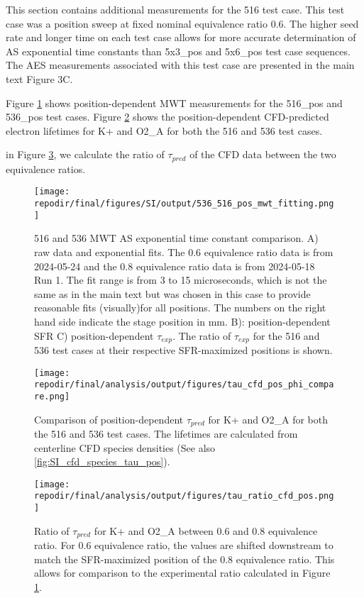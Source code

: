 This section contains additional measurements for the 516 test case. This test case was a position sweep at fixed nominal equivalence ratio 0.6. The higher seed rate and longer time on each test case allows for more accurate determination of AS exponential time constants than 5x3\_pos and 5x6\_pos test case sequences. The AES measurements associated with this test case are presented in the main text Figure 3C.

Figure \ref{fig:SI_536_516_pos_mwt_fitting} shows position-dependent MWT measurements for the 516\_pos and 536\_pos test cases. Figure \ref{fig:SI_tau_cfd_pos_phi_compare} shows the position-dependent CFD-predicted electron lifetimes for K+ and O2\_A for both the 516 and 536 test cases. 

in Figure \ref{fig:SI_tau_ratio_cfd_pos}, we calculate the ratio of $\tau_{pred}$ of the CFD data between the two equivalence ratios.


\begin{figure}[]
\centering
\texttt{[image: \\repodir/final/figures/SI/output/536\_516\_pos\_mwt\_fitting.png]}
\caption{516 and 536 MWT AS exponential time constant comparison. A) raw data and exponential fits. The 0.6 equivalence ratio data is from 2024-05-24 and the 0.8 equivalence ratio data is from 2024-05-18 Run 1. The fit range is from 3 to 15 microseconds, which is not the same as in the main text but was chosen in this case to provide reasonable fits (visually)for all positions. The numbers on the right hand side indicate the stage position in mm. B): position-dependent SFR C) position-dependent $\tau_{exp}$. The ratio of $\tau_{exp}$ for the 516 and 536 test cases at their respective SFR-maximized positions is shown.}
\label{fig:SI_536_516_pos_mwt_fitting}
\end{figure}


\begin{figure}[]
\centering
\texttt{[image: \\repodir/final/analysis/output/figures/tau\_cfd\_pos\_phi\_compare.png]}
\caption{Comparison of position-dependent $\tau_{pred}$ for K+ and O2\_A for both the 516 and 536 test cases. The lifetimes are calculated from centerline CFD species densities (See also \ref{fig:SI_cfd_species_tau_pos}).}
\label{fig:SI_tau_cfd_pos_phi_compare}
\end{figure}


\begin{figure}[]
\centering
\texttt{[image: \\repodir/final/analysis/output/figures/tau\_ratio\_cfd\_pos.png]}
\caption{Ratio of $\tau_{pred}$ for K+ and O2\_A between 0.6 and 0.8 equivalence ratio. For 0.6 equivalence ratio, the values are shifted downstream to match the SFR-maximized position of the 0.8 equivalence ratio. This allows for comparison to the experimental ratio calculated in Figure \ref{fig:SI_536_516_pos_mwt_fitting}.}
\label{fig:SI_tau_ratio_cfd_pos}
\end{figure}

